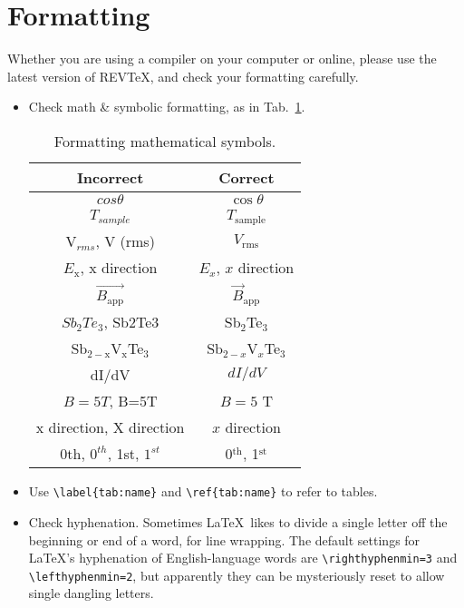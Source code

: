 \documentclass[aps,prb,twocolumn,superscriptaddress,floatfix,longbibliography]{revtex4-2}
\begin{document}
\newpage
\section{\label{sec:Formatting}Formatting}

\noindent Whether you are using a compiler on your computer or online, please use the latest version of REVTeX, and check your formatting carefully.
\begin{itemize}[label=$\Box$]
\item Check math \& symbolic formatting, as in Tab.\ \ref{tab:mathformat}.
\begin{table}[h!]
  \begin{center}
    \caption{Formatting mathematical symbols.}
    \label{tab:mathformat}
    \begin{tabular}{c|c} %
      \hline
      \textbf{Incorrect} & \textbf{Correct} \\
      \hline \hline
      $cos \theta$ & $\cos \theta$ \\
      $T_{sample}$ & $T_\mathrm{sample}$ \\
      V$_{rms}$, V (rms) & $V_\mathrm{rms}$ \\
      $E_\mathrm{x}$, x direction & $E_x$, $x$ direction \\
      $\vec{B_\mathrm{app}}$ & $\vec{B}_\mathrm{app}$ \\
      $Sb_2Te_3$, Sb2Te3 & Sb$_2$Te$_3$ \\
      Sb$_{2-\mathrm{x}}$V$_\mathrm{x}$Te$_3$ & Sb$_{2-x}$V$_x$Te$_3$ \\
      dI/dV & $dI/dV$ \\
      $B = 5 T$, B=5T & $B=5$ T \\
      x direction, X direction & $x$ direction \\
      0th, $0^{th}$, 1st, $1^{st}$ & 0$^\mathrm{th}$, 1$^\mathrm{st}$ \\
      \hline
    \end{tabular}
  \end{center}
\end{table}
\item Use {\tt \textbackslash label\{tab:name\}} and {\tt \textbackslash ref\{tab:name\}} to refer to tables.
\item Check hyphenation. Sometimes \LaTeX\ likes to divide a single letter off the beginning or end of a word, for line wrapping. The default settings for \LaTeX's hyphenation of English-language words are {\tt \textbackslash righthyphenmin=3} and {\tt \textbackslash lefthyphenmin=2}, but apparently they can be mysteriously reset to allow single dangling letters.

\end{itemize}
\end{document}
